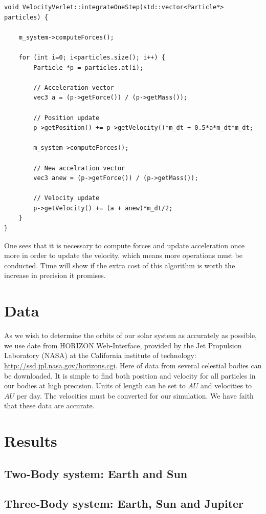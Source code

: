 \documentclass[10pt,a4paper]{amsart}
\begin{document}
\begin{lstlisting}
void VelocityVerlet::integrateOneStep(std::vector<Particle*> particles) {
    
	m_system->computeForces();
    
	for (int i=0; i<particles.size(); i++) {
		Particle *p = particles.at(i);

		// Acceleration vector
		vec3 a = (p->getForce()) / (p->getMass());

		// Position update
		p->getPosition() += p->getVelocity()*m_dt + 0.5*a*m_dt*m_dt;

		m_system->computeForces();

		// New accelration vector
		vec3 anew = (p->getForce()) / (p->getMass());

		// Velocity update
		p->getVelocity() += (a + anew)*m_dt/2;
	}
}
\end{lstlisting}
One sees that it is necessary to compute forces and update acceleration once more in order to update the velocity, which means more operations must be conducted. Time will show if the extra cost of this algorithm is worth the  increase in precision it promises.

\section{Data}
As we wish to determine the orbits of our solar system as accurately as possible, we use date from HORIZON Web-Interface, provided by the Jet Propulsion Laboratory (NASA) at the California institute of technology: \url{http://ssd.jpl.nasa.gov/horizons.cgi}. Here of data from several celestial bodies can be downloaded. It is simple to find both position and velocity for all particles in our bodies at high precision. Units of length can be set to $AU$ and velocities to $AU$ per day. The velocities must be converted for our simulation. We have faith that these data are accurate.

\section{Results}

\subsection{Two-Body system: Earth and Sun}

\subsection{Three-Body system: Earth, Sun and Jupiter}
\end{document}
